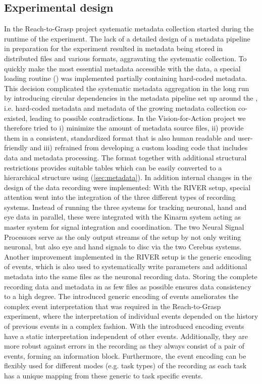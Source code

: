 \subsection{Experimental design}
In the Reach-to-Grasp project systematic metadata collection started during the runtime of the experiment. The lack of a detailed design of a metadata pipeline in preparation for the experiment resulted in metadata being stored in distributed files and various formats, aggravating the systematic collection. To quickly make the most essential metadata accessible with the data, a special loading routine () was implemented partially containing hard-coded metadata. This decision complicated the systematic metadata aggregation in the long run by introducing circular dependencies in the metadata pipeline set up around the , i.e. hard-coded metadata and metadata of the growing metadata collection co-existed, leading to possible contradictions.
In the Vision-for-Action project we therefore tried to i) minimize the amount of metadata source files, ii) provide them in a consistent, standardized format that is also human readable and user-friendly and iii) refrained from developing a custom loading code that includes data and metadata processing. The  format together with additional structural restrictions provides suitable tables which can be easily converted to a hierarchical  structure using  (\cref{sec:metadata}).
In addition internal changes in the design of the data recording were implemented: With the RIVER setup, special attention went into the integration of the three different types of recording systems. Instead of running the three systems for tracking neuronal, hand and eye data in parallel, these were integrated with the Kinarm system acting as master system for signal integration and coordination. The two Neural Signal Processors serve as the only output streams of the setup by not only writing neuronal, but also eye and hand signals to disc via the two Cerebus systems.
Another improvement implemented in the RIVER setup is the generic encoding of events, which is also used to systematically write parameters and additional metadata into the same files as the neuronal recording data. Storing the complete recording data and metadata in as few files as possible ensures data consistency to a high degree. The introduced generic encoding of events ameliorates the complex event interpretation that was required in the Reach-to-Grasp experiment, where the interpretation of individual events depended on the history of previous events in a complex fashion. With the introduced encoding events have a static interpretation independent of other events. Additionally, they are more robust against errors in the recording as they always consist of a pair of events, forming an information block. Furthermore, the event encoding can be flexibly used for different modes (e.g. task types) of the recording as each task has a unique mapping from these generic to task specific events.

